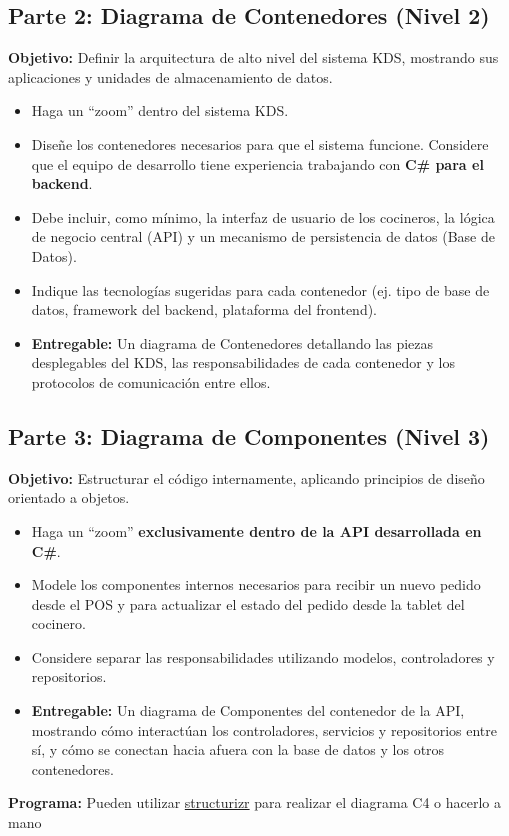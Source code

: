 \documentclass[12pt]{article}
\begin{document}
\subsection{Parte 2: Diagrama de Contenedores (Nivel 2)}
\textbf{Objetivo:} Definir la arquitectura de alto nivel del sistema KDS, mostrando sus aplicaciones y unidades de almacenamiento de datos.
\begin{itemize}
    \item Haga un ``zoom'' dentro del sistema KDS.
    \item Diseñe los contenedores necesarios para que el sistema funcione. Considere que el equipo de desarrollo tiene experiencia trabajando con \textbf{C\# para el backend}.
    \item Debe incluir, como mínimo, la interfaz de usuario de los cocineros, la lógica de negocio central (API) y un mecanismo de persistencia de datos (Base de Datos).
    \item Indique las tecnologías sugeridas para cada contenedor (ej. tipo de base de datos, framework del backend, plataforma del frontend).
    \item \textbf{Entregable:} Un diagrama de Contenedores detallando las piezas desplegables del KDS, las responsabilidades de cada contenedor y los protocolos de comunicación entre ellos.
\end{itemize}

\subsection{Parte 3: Diagrama de Componentes (Nivel 3)}
\textbf{Objetivo:} Estructurar el código internamente, aplicando principios de diseño orientado a objetos.
\begin{itemize}
    \item Haga un ``zoom'' \textbf{exclusivamente dentro de la API desarrollada en C\#}.
    \item Modele los componentes internos necesarios para recibir un nuevo pedido desde el POS y para actualizar el estado del pedido desde la tablet del cocinero.
    \item Considere separar las responsabilidades utilizando modelos, controladores y repositorios.
    \item \textbf{Entregable:} Un diagrama de Componentes del contenedor de la API, mostrando cómo interactúan los controladores, servicios y repositorios entre sí, y cómo se conectan hacia afuera con la base de datos y los otros contenedores.
\end{itemize}

\textbf{Programa: }Pueden utilizar \href{https://playground.structurizr.com}{structurizr} para realizar el diagrama C4 o hacerlo a mano  
\end{document}
